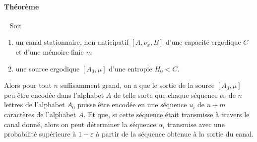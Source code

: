 	\paragraph{Théorème}\ 
	\newline
	Soit 
	\begin{enumerate}
		\item un canal stationnaire, non-anticipatif $[A,\nu_x,B]$ d'une capacité ergodique $C$ et d'une mémoire finie $m$
		\item une source ergodique $[A_0,\mu]$ d'une entropie $H_0<C$.
	\end{enumerate}
	Alors pour tout $n$ suffisamment grand, on a que le sortie de la source $[A_0,\mu]$ peu être encodée dans l'alphabet $A$ de telle sorte que
	chaque séquence $\alpha_i$ de $n$ lettres de l'alphabet $A_0$ puisse être encodée en une séquence $u_i$ de $n+m$ caractères de l'alphabet $A$. 
	Et que, si cette séquence était transmisse à travers le canal donné, alors on peut déterminer la séquence $\alpha_i$ transmise avec une probabilité 
	supérieure à $1-\varepsilon$ à partir de la séquence obtenue à la sortie du canal.



